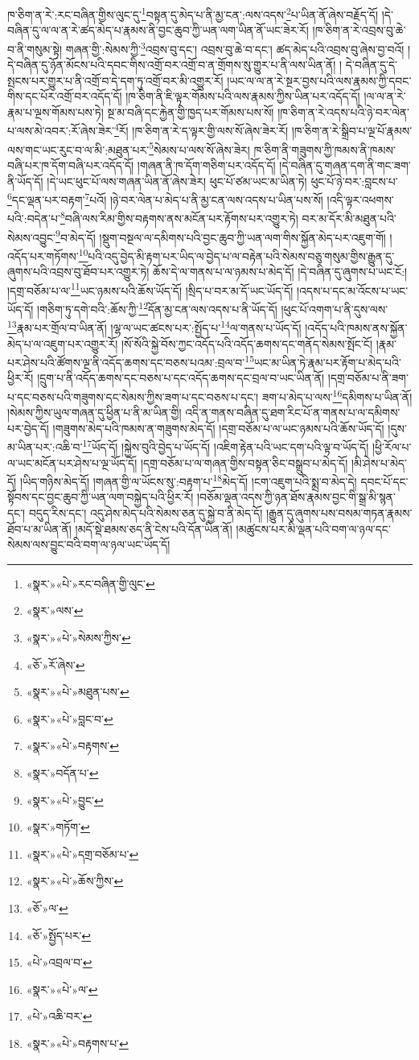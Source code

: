 ཁ་ཅིག་ན་རེ་:རང་བཞིན་གྱིས་ལུང་དུ་\footnote{«སྣར་»«པེ་»རང་བཞིན་གྱི་ལུང་}བསྟན་དུ་མེད་པ་ནི་མྱ་ངན་:ལས་འདས་\footnote{«སྣར་»ལས་}པ་ཡིན་ནོ་ཞེས་བརྗོད་དོ། །དེ་བཞིན་དུ་ལ་ལ་ན་རེ་ཚད་མེད་པ་རྣམས་ནི་བྱང་ཆུབ་ཀྱི་ཡན་ལག་ཡིན་ནོ་ཡང་ཟེར་རོ། །ཁ་ཅིག་ན་རེ་འབྲས་བུ་ཆེ་བ་ནི་གསུམ་སྟེ། གཞན་གྱི་:སེམས་ཀྱི་\footnote{«སྣར་»«པེ་»སེམས་ཀྱིས་}འབྲས་བུ་དང་། འབྲས་བུ་ཆེ་བ་དང་། ཚད་མེད་པའི་འབྲས་བུ་ཞེས་བྱ་བའོ། །དེ་བཞིན་དུ་ཉོན་མོངས་པའི་དབང་གིས་འགྲོ་བར་འགྲོ་བ་ན་གྲོགས་སུ་གྱུར་པ་ནི་ལས་ཡིན་ནོ། །
དེ་བཞིན་དུ་དེ་སྤངས་པར་གྱུར་པ་ནི་འགྲོ་བ་དེ་དག་ཏུ་འགྲོ་བར་མི་འགྱུར་རོ། །ཡང་ལ་ལ་ན་རེ་སྔར་བྱས་པའི་ལས་རྣམས་ཀྱི་དབང་གིས་དང་པོར་འགྲོ་བར་འདོད་དོ། །ཁ་ཅིག་ནི་ཇི་ལྟར་གོམས་པའི་ལས་རྣམས་ཀྱིས་ཡིན་པར་འདོད་དོ། །ལ་ལ་ན་རེ་རྣམ་པ་ལྔས་གོམས་པས་ཏེ། སྔ་མ་བཞི་དང་རྐྱེན་གྱི་ཁྱད་པར་གོམས་པས་སོ། །ཁ་ཅིག་ན་རེ་འདས་པའི་ཉེ་བར་ལེན་པ་ལས་མེ་འབར་:རོ་ཞེས་ཟེར་\footnote{«ཅོ་»རོ་ཞེས་}རོ། །ཁ་ཅིག་ན་རེ་ད་ལྟར་གྱི་ལས་སོ་ཞེས་ཟེར་རོ། །ཁ་ཅིག་ན་རེ་སྒྲིབ་པ་ལྔ་པོ་རྣམས་ལས་གང་ཡང་རུང་བ་ལ་མི་:མཐུན་པར་\footnote{«སྣར་»«པེ་»མཐུན་པས་}སེམས་པ་ལས་སོ་ཞེས་ཟེར། ཁ་ཅིག་ནི་གཟུགས་ཀྱི་ཁམས་ནི་ཁམས་བཞི་པར་ཁ་དོག་བཞི་པར་འདོད་དོ། །གཞན་ནི་ཁ་དོག་གཅིག་པར་འདོད་དོ། །དེ་བཞིན་དུ་གཞན་དག་ནི་གང་ཟག་ནི་ཡོད་དོ། །དེ་ཡང་ཕུང་པོ་ལས་གཞན་ཡིན་ནོ་ཞེས་ཟེར། ཕུང་པོ་ཙམ་ཡང་མ་ཡིན་ཏེ། ཕུང་པོ་ཉེ་བར་:བླངས་པ་\footnote{«སྣར་»«པེ་»བླང་བ་}དང་ལྡན་པར་བརྟག་\footnote{«སྣར་»«པེ་»བརྟགས་}པའོ། །ཉེ་བར་ལེན་པ་མེད་པ་ནི་མྱ་ངན་ལས་འདས་པ་ཡིན་པས་སོ། །འདི་ལྟར་འཕགས་པའི་:བདེན་པ་\footnote{«སྣར་»བདོན་པ་}བཞི་ལས་རིམ་གྱིས་བརྟགས་ནས་མངོན་པར་རྟོགས་པར་འགྱུར་ཏེ། བར་མ་དོར་མི་མཐུན་པའི་སེམས་འབྱུང་\footnote{«སྣར་»«པེ་»བྱུང་}བ་མེད་དོ། །སྡུག་བསྔལ་ལ་དམིགས་པའི་བྱང་ཆུབ་ཀྱི་ཡན་ལག་གིས་སྐྱོན་མེད་པར་འཇུག་གོ། །འདོད་པར་གཏོགས་\footnote{«སྣར་»གཏོག་}པའི་འདུ་བྱེད་མི་རྟག་པར་ཡིད་ལ་བྱེད་པ་ལ་བརྟེན་པའི་སེམས་བཅུ་གསུམ་གྱིས་རྒྱུན་དུ་ཞུགས་པའི་འབྲས་བུ་ཐོབ་པར་འགྱུར་ཏེ། ཆོས་དེ་ལ་གནས་པ་ལ་ཉམས་པ་མེད་དོ། །དེ་བཞིན་དུ་ཞུགས་པ་ཡང་ངོ:། །དགྲ་བཅོམ་པ་ལ་\footnote{«སྣར་»«པེ་»དགྲ་བཅོམ་པ་}ཡང་ཉམས་པའི་ཆོས་ཡོད་དོ། །སྲིད་པ་བར་མ་དོ་ཡང་ཡོད་དོ། །འདས་པ་དང་མ་འོངས་པ་ཡང་ཡོད་དོ། །གཅིག་ཏུ་དགེ་བའི་:ཆོས་ཀྱི་\footnote{«སྣར་»«པེ་»ཆོས་ཀྱིས་}དོན་མྱ་ངན་ལས་འདས་པ་ནི་ཡོད་དོ། །ཕུང་པོ་འགག་པ་ནི་དུས་ལས་\footnote{«ཅོ་»ལ་}རྣམ་པར་གྲོལ་བ་ཡིན་ནོ། །ལྷ་ལ་ཡང་ཚངས་པར་:སྤྱོད་པ་\footnote{«ཅོ་»སྤྱོད་པར་}ལ་གནས་པ་ཡོད་དོ། །འདོད་པའི་ཁམས་ནས་སྐྱོན་མེད་པ་ལ་འཇུག་པར་འགྱུར་རོ། །སོ་སོའི་སྐྱེ་བོས་ཀྱང་འདོད་པའི་འདོད་ཆགས་དང་གནོད་སེམས་སྤོང་ངོ། །རྣམ་པར་ཤེས་པའི་ཚོགས་ལྔ་ནི་འདོད་ཆགས་དང་བཅས་པའམ་:བྲལ་བ་\footnote{«པེ་»འབྲལ་བ་}ཡང་མ་ཡིན་ཏེ་རྣམ་པར་རྟོག་པ་མེད་པའི་ཕྱིར་རོ། །དྲུག་པ་ནི་འདོད་ཆགས་དང་བཅས་པ་དང་འདོད་ཆགས་དང་བྲལ་བ་ཡང་ཡིན་ནོ། །དགྲ་བཅོམ་པ་ནི་ཟག་པ་དང་བཅས་པའི་གཟུགས་དང་སེམས་ཀྱིས་ཟག་པ་དང་བཅས་པ་དང་། ཟག་པ་མེད་པ་ལས་\footnote{«སྣར་»«པེ་»ལ་}དམིགས་པ་ཡིན་ནོ། །སེམས་ཀྱིས་ཡུལ་གཞན་དུ་ཕྱིན་པ་ནི་མ་ཡིན་གྱི། འདི་ན་གནས་བཞིན་དུ་ཐག་རིང་པོ་ན་གནས་པ་ལ་དམིགས་པར་བྱེད་དོ། །གཟུགས་མེད་པའི་ཁམས་ན་གཟུགས་མེད་དོ། །དགྲ་བཅོམ་པ་ལ་ཡང་ཉམས་པའི་ཆོས་ཡོད་དོ། །དུས་མ་ཡིན་པར་:འཆི་བ་\footnote{«པེ་»འཆི་བར་}ཡོད་དོ། །སྐྱེས་བུའི་བྱེད་པ་ཡོད་དོ། །འཇིག་རྟེན་པའི་ཡང་དག་པའི་ལྟ་བ་ཡོད་དོ། །ཕྱི་རོལ་པ་ལ་ཡང་མངོན་པར་ཤེས་པ་ལྔ་ཡོད་དོ། །དགྲ་བཅོམ་པ་ལ་གཞན་གྱིས་བསྟན་ཅིང་བསྒྲུབ་པ་མེད་དོ། །མི་ཤེས་པ་མེད་དོ། །ཡིད་གཉིས་མེད་དོ། །གཞན་གྱི་ལ་ཡོངས་སུ་:བརྟག་པ་\footnote{«སྣར་»«པེ་»བརྟགས་པ་}མེད་དོ། །ངག་འཇུག་པའི་སྨྲ་བ་མེད་དེ། དབང་པོ་དང་སྟོབས་དང་བྱང་ཆུབ་ཀྱི་ཡན་ལག་བསྐྱེད་པའི་ཕྱིར་རོ། །བཅོམ་ལྡན་འདས་ཀྱི་ཉན་ཐོས་རྣམས་བྱང་གི་སྒྲ་མི་སྙན་དང་། བདུད་རིས་དང་། འདུ་ཤེས་མེད་པའི་སེམས་ཅན་དུ་སྐྱེ་བ་ནི་མེད་དོ། །རྒྱུན་དུ་ཞུགས་པས་བསམ་གཏན་རྣམས་ཐོབ་པ་མ་ཡིན་ནོ། །མདོ་སྡེ་ཐམས་ཅད་ནི་ངེས་པའི་དོན་ཡིན་ནོ། །མཚུངས་པར་མི་ལྡན་པའི་བག་ལ་ཉལ་དང་སེམས་ལས་བྱུང་བའི་བག་ལ་ཉལ་ཡང་ཡོད་དོ། 